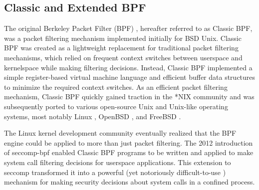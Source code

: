 \subsection{Classic and Extended BPF}

The original Berkeley Packet Filter (BPF) \cite{mccanne1993_bpf}, hereafter referred to as Classic BPF, was a packet filtering mechanism implemented initially for BSD Unix. Classic BPF was created as a lightweight replacement for traditional packet filtering mechanisms, which relied on frequent context switches between userspace and kernelspace while making filtering decisions. Instead, Classic BPF implemented a simple register-based virtual machine language and efficient buffer data structures to minimize the required context switches. As an efficient packet filtering mechanism, Classic BPF quickly gained traction in the *NIX community and was subsequently ported to various open-source Unix and Unix-like operating systems, most notably Linux \cite{linux_bpf}, OpenBSD \cite{openbsd_bpf}, and FreeBSD \cite{freebsd_bpf}.

The Linux kernel development community eventually realized that the BPF engine could be applied to more than just packet filtering. The 2012 introduction of seccomp-bpf \cite{drewry2012_seccomp_bpf,seccomp_bpf} enabled Classic BPF programs to be written and applied to make system call filtering decisions for userspace applications. This extension to seccomp transformed it into a powerful (yet notoriously difficult-to-use \cite{anderson2017_comparison}) mechanism for making security decisions about system calls in a confined process.

